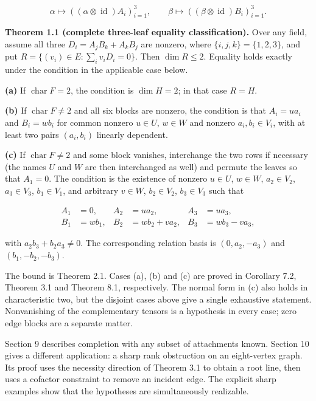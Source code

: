 \documentclass[11pt]{article}
\begin{document}
\nopagebreak[4]

\begin{equation*}
\alpha\longmapsto((\alpha\otimes\operatorname{id})A_i)_{i=1}^3,
\qquad
\beta\longmapsto((\beta\otimes\operatorname{id})B_i)_{i=1}^3.
\end{equation*}

\textbf{Theorem 1.1 (complete three-leaf equality classification).} Over any field, assume all three $D_i=A_jB_k+A_kB_j$ are nonzero, where $\{i,j,k\}=\{1,2,3\}$, and put $R=\{(v_i)\in E:\sum_i v_iD_i=0\}$. Then $\dim R\leq2$. Equality holds exactly under the condition in the applicable case below.


\nopagebreak[4]

\textbf{(a)} If $\operatorname{char}F=2$, the condition is $\dim H=2$; in that case $R=H$.


\textbf{(b)} If $\operatorname{char}F\ne2$ and all six blocks are nonzero, the condition is that $A_i=ua_i$ and $B_i=wb_i$ for common nonzero $u\in U$, $w\in W$ and nonzero $a_i,b_i\in V_i$, with at least two pairs $(a_i,b_i)$ linearly dependent.


\textbf{(c)} If $\operatorname{char}F\ne2$ and some block vanishes, interchange the two rows if necessary (the names $U$ and $W$ are then interchanged as well) and permute the leaves so that $A_1=0$. The condition is the existence of nonzero $u\in U$, $w\in W$, $a_2\in V_2$, $a_3\in V_3$, $b_1\in V_1$, and arbitrary $v\in W$, $b_2\in V_2$, $b_3\in V_3$ such that


\nopagebreak[4]

\begin{equation*}
\begin{aligned}
A_1&=0,&A_2&=ua_2,&A_3&=ua_3,\\
B_1&=wb_1,&B_2&=wb_2+va_2,&B_3&=wb_3-va_3,
\end{aligned}
\end{equation*}

with $a_2b_3+b_2a_3\ne0$. The corresponding relation basis is $(0,a_2,-a_3)$ and $(b_1,-b_2,-b_3)$.


The bound is Theorem 2.1. Cases (a), (b) and (c) are proved in Corollary 7.2, Theorem 3.1 and Theorem 8.1, respectively. The normal form in (c) also holds in characteristic two, but the disjoint cases above give a single exhaustive statement. Nonvanishing of the complementary tensors is a hypothesis in every case; zero edge blocks are a separate matter.


Section 9 describes completion with any subset of attachments known. Section 10 gives a different application: a sharp rank obstruction on an eight-vertex graph. Its proof uses the necessity direction of Theorem 3.1 to obtain a root line, then uses a cofactor constraint to remove an incident edge. The explicit sharp examples show that the hypotheses are simultaneously realizable.
\end{document}

